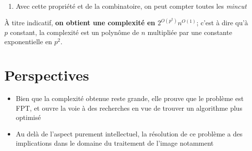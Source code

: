 \documentclass[a0,portrait]{a0poster}
\begin{document}
\begin{multicols}{2}
\begin{enumerate}
  \item Avec cette propriété et de la combinatoire, on peut compter toutes les \textit{mincut}
\end{enumerate}


À titre indicatif, \textbf{on obtient une complexité en $2^{O(p^2)}n^{O(1)}$}; c'est à dire qu'à $p$ constant, la complexité est un polynôme de $n$ multipliée par une constante exponentielle en $p^2$.


\color{SaddleBrown} %

\section*{Perspectives}

\begin{itemize}
  \item Bien que la complexité obtenue reste grande, elle prouve que le problème est FPT, et ouvre la voie à des recherches en vue de trouver un algorithme plus optimisé 
  \item Au delà de l'aspect purement intellectuel, la résolution de ce problème a des implications dans le domaine du traitement de l'image notamment
\end{itemize}

\end{multicols}
\end{document}
